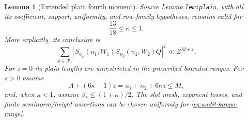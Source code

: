 \documentclass[11pt,a4paper]{article}
\numberwithin{equation}{section}
\newtheorem{lemma}[theorem]{Lemma}
\theoremstyle{remark}
\begin{document}
\begin{lemma}[Extended plain fourth moment]\label{lem:plain-extension}
Source Lemma \texttt{lem:plain}, with all its coefficient, support,
uniformity, and row-family hypotheses, remains valid for
\begin{equation}\label{eq:audit-kappa-range}
             \frac{13}{18}\le\kappa\le1.
\end{equation}
More explicitly, its conclusion is
\begin{equation}\label{eq:audit-plain-moment}
 \sum_{k\in\mathcal R_z}
 |S_{\psi_k}(n_1;W_1)S_{\psi_k}(n_2;W_2)Q|^2
 \ll Z^{M+\varepsilon}.
\end{equation}
For $z=0$ its plain lengths are unrestricted in the prescribed bounded
ranges.  For $z>0$ assume
\begin{equation}\label{eq:audit-affine-condition}
 A+(6\kappa-1)z=n_1+n_2+6\kappa z\le M,
\end{equation}
and, when $\kappa<1$, assume $\beta_*\le(1+\kappa)/2$.
The slot mesh, exponent losses, and finite seminorm/height assertions can
be chosen uniformly for \eqref{eq:audit-kappa-range}.

\end{lemma}
\end{document}
